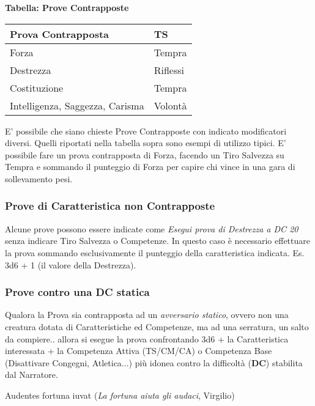 \begin{multicols}{2}
\smallskip

\textbf{Tabella: Prove Contrapposte}\label{Tabella Prove Contrapposte e Caratteristiche}

\smallskip

\noindent\begin{tabularx}{\linewidth}{Xl}
\toprule
\textbf{Prova Contrapposta}& \textbf{TS} \\
\toprule
Forza& Tempra \\
Destrezza&Riflessi\\
Costituzione& Tempra\\
Intelligenza, Saggezza, Carisma& Volontà
\end{tabularx}

\smallskip

E' possibile che siano chieste Prove Contrapposte con indicato modificatori diversi. Quelli riportati nella tabella sopra sono esempi di utilizzo tipici. E' possibile fare un prova contrapposta di Forza, facendo un Tiro Salvezza su Tempra e sommando il punteggio di Forza per capire chi vince in una gara di sollevamento pesi.

\subsubsection{Prove di Caratteristica non Contrapposte}

Alcune prove possono essere indicate come \emph{Esegui prova di Destrezza a DC 20} senza indicare Tiro Salvezza o Competenze. In questo caso è necessario effettuare la prova sommando esclusivamente il punteggio della caratteristica indicata. Es. 3d6 + 1 (il valore della Destrezza).

\subsubsection{Prove contro una DC statica}

Qualora la Prova sia contrapposta ad un \textit{avversario statico}, ovvero non una creatura dotata di Caratteristiche ed Competenze, ma ad una serratura, un salto da compiere.. allora si esegue la prova confrontando 3d6 + la Caratteristica interessata + la Competenza Attiva (TS/CM/CA) o Competenza Base (Disattivare Congegni, Atletica...) più idonea contro la difficoltà (\textbf{DC}) stabilita dal Narratore.

\begin{enfasi}{Audentes fortuna iuvat (\emph{La fortuna aiuta gli audaci}, Virgilio) }\end{enfasi}


\end{multicols}
